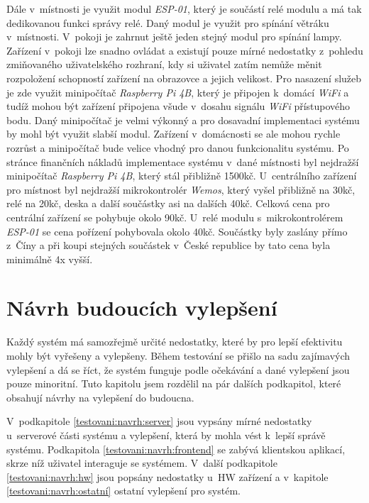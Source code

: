 Dále v~místnosti je využit modul \emph{ESP-01}, který je součástí relé modulu a má tak dedikovanou funkci správy relé.
Daný modul je využit pro spínání větráku v~místnosti.
V~pokoji je zahrnut ještě jeden stejný modul pro spínání lampy.
Zařízení v~pokoji lze snadno ovládat a existují pouze mírné nedostatky z~pohledu zmiňovaného uživatelského rozhraní, kdy si uživatel zatím nemůže měnit rozpoložení schopností zařízení na obrazovce a jejich velikost.
Pro nasazení služeb je zde využit minipočítač \emph{Raspberry Pi 4B}, který je připojen k~domácí \emph{WiFi} a tudíž mohou být zařízení připojena všude v~dosahu signálu \emph{WiFi} přístupového bodu.
Daný minipočítač je velmi výkonný a pro dosavadní implementaci systému by mohl být využit slabší modul.
Zařízení v~domácnosti se ale mohou rychle rozrůst a minipočítač bude velice vhodný pro danou funkcionalitu systému.
\newpage
Po stránce finančních nákladů implementace systému v~dané místnosti byl nejdražší minipočítač \emph{Raspberry Pi 4B}, který stál přibližně 1500kč.
U~centrálního zařízení pro místnost byl nejdražší mikrokontrolér \emph{Wemos}, který vyšel přibližně na 30kč, relé na 20kč, deska a další součástky asi na dalších 40kč.
Celková cena pro centrální zařízení se pohybuje okolo 90kč.
U~relé modulu s~mikrokontrolérem \emph{ESP-01} se cena pořízení pohybovala okolo 40kč.
Součástky byly zaslány přímo z~Číny a při koupi stejných součástek v~České republice by tato cena byla minimálně 4x vyšší.

\section{Návrh budoucích vylepšení}
\label{testovani:praxe}
Každý systém má samozřejmě určité nedostatky, které by pro lepší efektivitu mohly být vyřešeny a vylepšeny.
Během testování se přišlo na sadu zajímavých vylepšení a dá se říct, že systém funguje podle očekávání a dané vylepšení jsou pouze minoritní.
Tuto kapitolu jsem rozdělil na pár dalších podkapitol, které obsahují návrhy na vylepšení do budoucna.

V~podkapitole \ref{testovani:navrh:server} jsou vypsány mírné nedostatky u~serverové části systému a vylepšení, která by mohla vést k~lepší správě systému.
Podkapitola \ref{testovani:navrh:frontend} se zabývá klientskou aplikací, skrze níž uživatel interaguje se systémem.
V~další podkapitole \ref{testovani:navrh:hw} jsou popsány nedostatky u~HW zařízení a v~kapitole \ref{testovani:navrh:ostatní} ostatní vylepšení pro systém.

